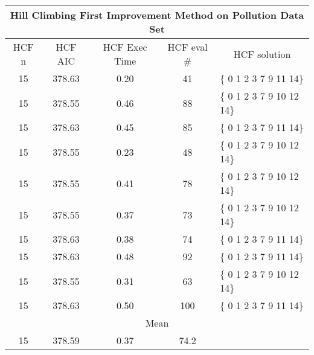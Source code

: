 \begin{tabular}{|c|c|c|c|l|}
	\hline
	\multicolumn{5}{|c|}{Hill Climbing First Improvement Method on Pollution Data Set}                    \\ \hline
	HCF n & HCF AIC     & HCF Exec Time & HCF eval \# & \multicolumn{1}{c|}{HCF solution} \\ \hline
	15    & 378.63 & 0.20              & 41                     & \{ 0 1 2 3 7 9 11 14\}            \\ \hline
	15    & 378.55 & 0.46               & 88                     & \{ 0 1 2 3 7 9 10 12 14\}         \\ \hline
	15    & 378.63 & 0.45              & 85                     & \{ 0 1 2 3 7 9 11 14\}            \\ \hline
	15    & 378.55 & 0.23              & 48                     & \{ 0 1 2 3 7 9 10 12 14\}         \\ \hline
	15    & 378.55 & 0.41               & 78                     & \{ 0 1 2 3 7 9 10 12 14\}         \\ \hline
	15    & 378.55 & 0.37              & 73                     & \{ 0 1 2 3 7 9 10 12 14\}         \\ \hline
	15    & 378.63 & 0.38              & 74                     & \{ 0 1 2 3 7 9 11 14\}            \\ \hline
	15    & 378.63 & 0.48               & 92                     & \{ 0 1 2 3 7 9 11 14\}            \\ \hline
	15    & 378.55 & 0.31              & 63                     & \{ 0 1 2 3 7 9 10 12 14\}         \\ \hline
	15    & 378.63 & 0.50              & 100                    & \{ 0 1 2 3 7 9 11 14\}            \\ \hline
	\multicolumn{5}{|c|}{Mean}                                                                            \\ \hline
	15    & 378.59 & 0.37             & 74.2                   &                                   \\ \hline
\end{tabular}

